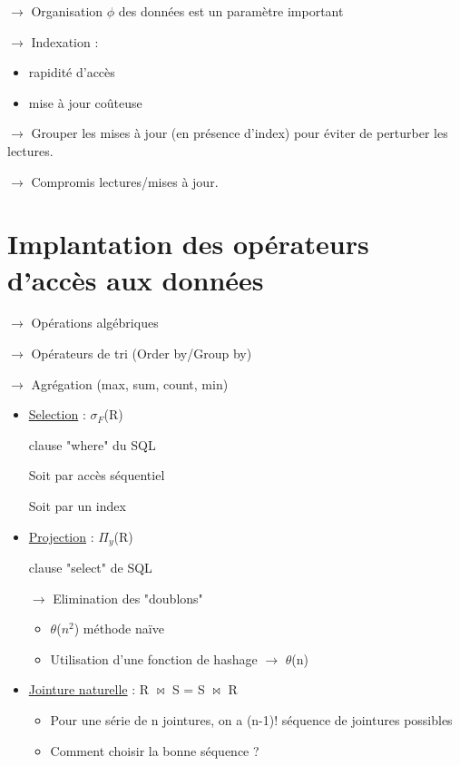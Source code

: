 \documentclass{article}
\begin{document}
$\rightarrow$ Organisation $\phi$ des données est un paramètre important

$\rightarrow$ Indexation : 
\begin{itemize}
	\item rapidité d'accès
	\item mise à jour coûteuse
\end{itemize}

$\rightarrow$ Grouper les mises à jour (en présence d'index) pour éviter de perturber les lectures.

$\rightarrow$ Compromis lectures/mises à jour.

\section*{Implantation des opérateurs d'accès aux données}

$\rightarrow$ Opérations algébriques

$\rightarrow$ Opérateurs de tri (Order by/Group by)

$\rightarrow$ Agrégation (max, sum, count, min)

\begin{itemize}\renewcommand{\labelitemi}{$\bullet$}
	\item \underline{Selection} : $\sigma_{F}$(R)

clause "where" du SQL

Soit par accès séquentiel

Soit par un index

	\item \underline{Projection} : $\Pi_{y}$(R)

clause "select" de SQL



$\rightarrow$ Elimination des "doublons"
	\begin{itemize}
		\item $\theta$($n^{2}$) méthode naïve
		\item Utilisation d'une fonction de hashage $\rightarrow$ $\theta$(n)
	\end{itemize}

	\item \underline{Jointure naturelle} : R $\bowtie$ S = S $\bowtie$ R
		
	\begin{itemize}
		\item Pour une série de n jointures, on a (n-1)! séquence de jointures possibles
		\item Comment choisir la bonne séquence ?
	\end{itemize} 
\end{itemize}
\end{document}
